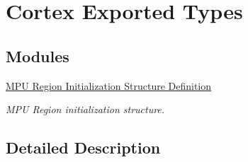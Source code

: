 \hypertarget{group___c_o_r_t_e_x___exported___types}{}\section{Cortex Exported Types}
\label{group___c_o_r_t_e_x___exported___types}
\subsection*{Modules}
\begin{DoxyCompactItemize}
\item 
\hyperlink{group___c_o_r_t_e_x___m_p_u___region___initialization___structure__definition}{M\+P\+U Region Initialization Structure Definition}
\begin{DoxyCompactList}\small\item\em M\+PU Region initialization structure. \end{DoxyCompactList}\end{DoxyCompactItemize}


\subsection{Detailed Description}
